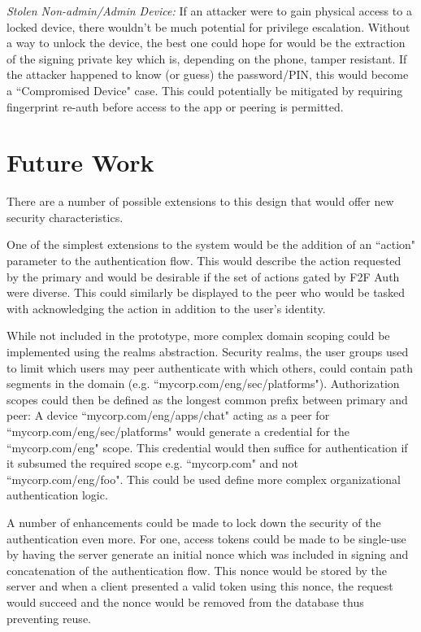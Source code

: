 \documentclass[letterpaper, 10 pt, conference]{ieeeconf}
\begin{document}
  \emph{Stolen Non-admin/Admin Device:} If an attacker were to gain physical access to a locked device, there wouldn't be much potential for privilege escalation.
  Without a way to unlock the device, the best one could hope for would be the extraction of the signing private key which is, depending on the phone, tamper resistant.
  If the attacker happened to know (or guess) the password/PIN, this would become a ``Compromised Device" case.
  This could potentially be mitigated by requiring fingerprint re-auth before access to the app or peering is permitted.

\section{Future Work} \label{future}
  There are a number of possible extensions to this design that would offer new security characteristics.

  One of the simplest extensions to the system would be the addition of an ``action" parameter to the authentication flow.
  This would describe the action requested by the primary and would be desirable if the set of actions gated by F2F Auth were diverse.
  This could similarly be displayed to the peer who would be tasked with acknowledging the action in addition to the user's identity.

  While not included in the prototype, more complex domain scoping could be implemented using the realms abstraction.
  Security realms, the user groups used to limit which users may peer authenticate with which others, could contain path segments in the domain (e.g. ``mycorp.com/eng/sec/platforms").
  Authorization scopes could then be defined as the longest common prefix between primary and peer:
  A device ``mycorp.com/eng/apps/chat" acting as a peer for ``mycorp.com/eng/sec/platforms" would generate a credential for the ``mycorp.com/eng" scope.
  This credential would then suffice for authentication if it subsumed the required scope e.g. ``mycorp.com" and not ``mycorp.com/eng/foo".
  This could be used define more complex organizational authentication logic.

  A number of enhancements could be made to lock down the security of the authentication even more.
  For one, access tokens could be made to be single-use by having the server generate an initial nonce which was included in signing and concatenation of the authentication flow.
  This nonce would be stored by the server and when a client presented a valid token using this nonce, the request would succeed and the nonce would be removed from the database thus preventing reuse.
\end{document}
